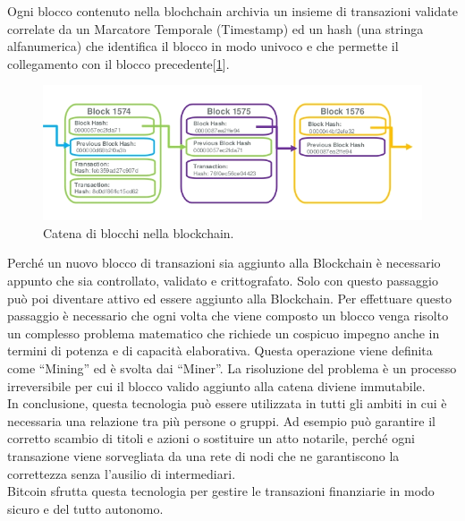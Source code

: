Ogni blocco contenuto nella blochchain archivia un insieme di transazioni validate correlate da un Marcatore Temporale (Timestamp) ed un hash (una stringa alfanumerica) che identifica il blocco in modo univoco e che permette il collegamento con il blocco precedente[\ref{fig:blockChain}].

\begin{figure}[H]
	\centering
	\includegraphics[width=\textwidth]{images/blockChain.png}
	\caption{Catena di blocchi nella blockchain.}
	\label{fig:blockChain}
\end{figure}

Perché un nuovo blocco di transazioni sia aggiunto alla Blockchain è necessario appunto che sia controllato, validato e crittografato. Solo con questo passaggio può poi diventare attivo ed essere aggiunto alla Blockchain. Per effettuare questo passaggio è necessario che ogni volta che viene composto un blocco venga risolto un complesso problema matematico che richiede un cospicuo impegno anche in termini di potenza e di capacità elaborativa. Questa operazione viene definita come “Mining” ed è svolta dai “Miner”. La risoluzione del problema è un processo irreversibile per cui il blocco valido aggiunto alla catena diviene immutabile.
\\In conclusione, questa tecnologia può essere utilizzata in tutti gli ambiti in cui è necessaria una relazione tra più persone o gruppi. Ad esempio può garantire il corretto scambio di titoli e azioni o sostituire un atto notarile, perché ogni transazione viene sorvegliata da una rete di nodi che ne garantiscono la correttezza senza l'ausilio di intermediari.
\\Bitcoin sfrutta questa tecnologia per gestire le transazioni finanziarie in modo sicuro e del tutto autonomo.